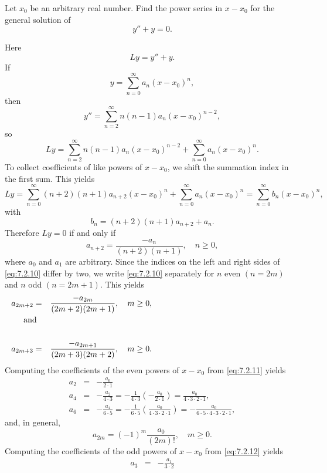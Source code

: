 \documentclass{ximera}
\begin{document}
\begin{example}\label{example:7.2.1}
Let $x_0$ be an arbitrary real number. Find the power series in
$x-x_0$ for the general solution of
\begin{equation}\label{eq:7.2.9}
 y''+ y=0.
\end{equation}
\begin{explanation}
Here
$$
Ly=y''+y.
$$
If
$$
y=\sum_{n=0}^\infty a_n(x-x_0)^n,
$$
then
$$
y''=\sum_{n=2}^\infty n(n-1)a_n(x-x_0)^{n-2},
$$
so
$$
Ly=\sum_{n=2}^\infty n(n-1)a_n(x-x_0)^{n-2}+\sum_{n=0}^\infty a_n(x-x_0)^n.
$$
To collect coefficients of like powers of $x-x_0$, we shift the summation
index in the first sum. This yields
$$
Ly=\sum^\infty_{n=0}(n+2)(n+1)a_{n+2}(x-x_0)^n +
 \sum^\infty_{n=0}a_n(x-x_0)^n
=\sum^\infty_{n=0}b_n(x-x_0)^n,
$$
with
$$
b_n=(n+2)(n+1)a_{n+2}+a_n.
$$
Therefore $Ly=0$ if and only if
\begin{equation}\label{eq:7.2.10}
a_{n+2}=\frac{-a_n}{(n+2)(n+1)},\quad n\geq0,
\end{equation}
where $a_0$ and $a_1$ are arbitrary. Since the indices on the left and
right sides of \eqref{eq:7.2.10} differ by two, we write \eqref{eq:7.2.10}
separately for $n$ even $(n=2m)$ and $n$ odd $(n=2m+1)$. This yields
\begin{eqnarray}
a_{2m+2}&=&\frac{-a_{2m}}{(2m+2)(2m+1)},\quad m\geq0,
\label{eq:7.2.11} \\%
\noalign{\mbox{and}}\nonumber\\
a_{2m+3}&=&\frac{-a_{2m+1}}{(2m+3)(2m+2)},\quad  m\geq0.
\label{eq:7.2.12}
\end{eqnarray}
Computing the coefficients of the even powers of $x-x_0$ from
\eqref{eq:7.2.11} yields
\begin{eqnarray*}
a_2&=&-\frac{a_0}{2\cdot1}\\
a_4&=&-\frac{a_2}{4\cdot3}=-\frac{1}{4\cdot3}
 \left(-\frac{a_0}{2\cdot1}\right)=
 \frac{a_0}{4\cdot3\cdot2\cdot1}, \\
a_6&=&-\frac{a_4}{6\cdot5}=-\frac{1}{6\cdot5}
 \left(\frac{a_0}{4\cdot3\cdot2\cdot1}\right)
=-\frac{a_0}{6\cdot5\cdot4\cdot3\cdot
 2\cdot1},
\end{eqnarray*}
and, in general,
\begin{equation}\label{eq:7.2.13}
a_{2m}=(-1)^m \frac{a_0}{(2m)!}   ,\quad  m\geq0.
\end{equation}
Computing the coefficients of the odd powers of $x-x_0$ from \eqref{eq:7.2.12}
yields
\begin{eqnarray*}
a_3&=&-\frac{a_1}{3\cdot2}\\

\end{eqnarray*}
\end{explanation}
\end{example}
\end{document}
